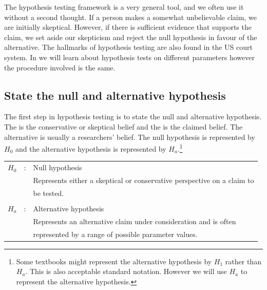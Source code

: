 The hypothesis testing framework is a very general tool, and we often use it without a second thought. If a person makes a somewhat unbelievable claim, we are initially skeptical. However, if there is sufficient evidence that supports the claim, we set aside our skepticism and reject the null hypothesis in favour of the alternative. The hallmarks of hypothesis testing are also found in the US court system. 
In {\color{red}{Chapters ???}} we will learn about hypothesis tests on different parameters
however the procedure involved is the same.




\vfill


\subsection{State the null and alternative hypothesis}
\label{sectionStateNullAndAlternative}

The first step in hypothesis testing is to state the null and alternative hypothesis.
The   is the conservative or skeptical belief
and the   is the claimed belief.
The alternative is usually a researchers' belief.
The null hypothesis is represented by $H_{0}$ and the 
alternative hypothesis is represented by $H_{a}$.\footnote{Some textbooks might represent the alternative hypothesis by $H_1$ rather than $H_a$. This is also acceptable standard notation. However we will use 
$H_a$ to represent the alternative hypothesis.}


\begin{termBox}{

\begin{tabular}{l c l}
$H_0$	& : 	& 	Null hypothesis	\\
	 	& 	&	Represents either a skeptical or conservative perspective on a claim to\\
		&	&	 be tested. \\
\hfill\\
$H_a$ 	& : 	& 	Alternative hypothesis\\
		&  	& 	Represents an alternative claim under consideration and is often \\
		&	&	represented by a range of possible parameter values.
\end{tabular} \vspace{2mm} }
\end{termBox}

